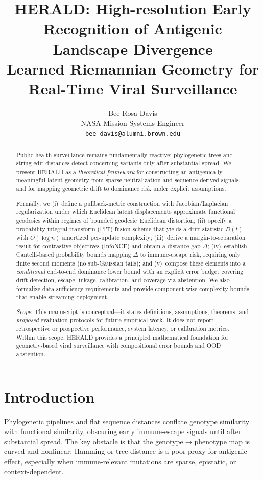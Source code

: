 \documentclass[11pt]{article}
\title{\textbf{HERALD: High-resolution Early Recognition of Antigenic Landscape Divergence}\\[0.5ex]
\large Learned Riemannian Geometry for Real-Time Viral Surveillance}
\author{Bee Rosa Davis\\
\small NASA Mission Systems Engineer\\
\small \texttt{bee\_davis@alumni.brown.edu}}
\date{} %
\begin{document}
\maketitle
\vspace{-1.5ex}

\begin{abstract}
Public-health surveillance remains fundamentally reactive: phylogenetic trees and string-edit distances detect concerning variants only after substantial spread. We present \textsc{HERALD} as a \emph{theoretical framework} for constructing an antigenically meaningful latent geometry from sparse neutralization and sequence-derived signals, and for mapping geometric drift to dominance risk under explicit assumptions.

Formally, we (i)~define a pullback-metric construction with Jacobian/Laplacian regularization under which Euclidean latent displacements approximate functional geodesics within regimes of bounded geodesic–Euclidean distortion; (ii)~specify a probability-integral transform (PIT) fusion scheme that yields a drift statistic $D(t)$ with $O(\log n)$ amortized per-update complexity; (iii)~derive a margin-to-separation result for contrastive objectives (InfoNCE) and obtain a distance gap $\Delta$; (iv)~establish Cantelli-based probability bounds mapping $\Delta$ to immune-escape risk, requiring only finite second moments (no sub-Gaussian tails); and (v)~compose these elements into a \emph{conditional} end-to-end dominance lower bound with an explicit error budget covering drift detection, escape linkage, calibration, and coverage via abstention. We also formalize data-sufficiency requirements and provide component-wise complexity bounds that enable streaming deployment.

\emph{Scope}: This manuscript is conceptual—it states definitions, assumptions, theorems, and \emph{proposed} evaluation protocols for future empirical work. It does not report retrospective or prospective performance, system latency, or calibration metrics. Within this scope, \textsc{HERALD} provides a principled mathematical foundation for geometry-based viral surveillance with compositional error bounds and OOD abstention.
\end{abstract}


\tableofcontents
\newpage

\section{Introduction}
Phylogenetic pipelines and flat sequence distances conflate genotype similarity with functional similarity, obscuring early immune-escape signals until after substantial spread. The key obstacle is that the genotype$\!\to\!$phenotype map is curved and nonlinear: Hamming or tree distance is a poor proxy for antigenic effect, especially when immune-relevant mutations are sparse, epistatic, or context-dependent.
\end{document}
